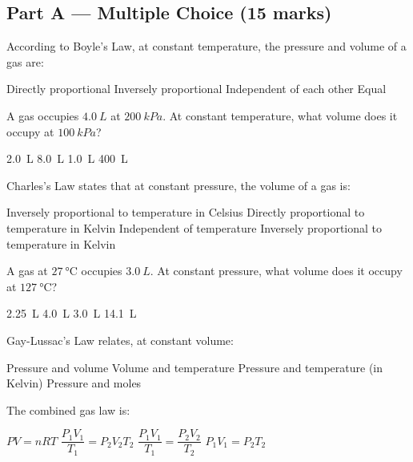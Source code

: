 \documentclass[addpoints]{exam}
\begin{document}
\newpage
\begin{questions}

\section*{Part A --- Multiple Choice (15 marks)}
\vspace{5mm}

\question[1] According to Boyle's Law, at constant temperature, the pressure and volume
of a gas are:
\begin{choices}
    \choice Directly proportional
    \correctchoice Inversely proportional
    \choice Independent of each other
    \choice Equal
\end{choices}

\question[1] A gas occupies $\SI{4.0}{L}$ at $\SI{200}{kPa}$. At constant temperature,
what volume does it occupy at $\SI{100}{kPa}$?
\begin{choices}
    \choice \SI{2.0}{L}
    \correctchoice \SI{8.0}{L}
    \choice \SI{1.0}{L}
    \choice \SI{400}{L}
\end{choices}

\question[1] Charles's Law states that at constant pressure, the volume of a gas is:
\begin{choices}
    \choice Inversely proportional to temperature in Celsius
    \correctchoice Directly proportional to temperature in Kelvin
    \choice Independent of temperature
    \choice Inversely proportional to temperature in Kelvin
\end{choices}

\question[1] A gas at $\SI{27}{\celsius}$ occupies $\SI{3.0}{L}$. At constant pressure, what
volume does it occupy at $\SI{127}{\celsius}$?
\begin{choices}
    \choice \SI{2.25}{L}
    \correctchoice \SI{4.0}{L}
    \choice \SI{3.0}{L}
    \choice \SI{14.1}{L}
\end{choices}

\question[1] Gay-Lussac's Law relates, at constant volume:
\begin{choices}
    \choice Pressure and volume
    \choice Volume and temperature
    \correctchoice Pressure and temperature (in Kelvin)
    \choice Pressure and moles
\end{choices}

\question[1] The combined gas law is:
\begin{choices}
    \choice $PV = nRT$
    \choice $\dfrac{P_1V_1}{T_1} = P_2V_2T_2$
    \correctchoice $\dfrac{P_1V_1}{T_1} = \dfrac{P_2V_2}{T_2}$
    \choice $P_1V_1 = P_2T_2$
\end{choices}


\end{questions}
\end{document}
